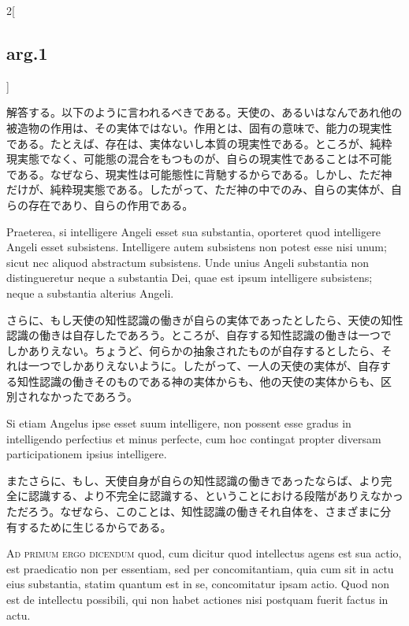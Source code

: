 \documentclass[paper=a4paper,fontsize=10pt,jafontsize=9pt,titlepage]{jlreq}
\begin{document}
\begin{paracol}{2}[\subsection{arg.1}]
\switchcolumn

解答する。以下のように言われるべきである。天使の、あるいはなんであれ他の
 被造物の作用は、その実体ではない。作用とは、固有の意味で、能力の現実性
 である。たとえば、存在は、実体ないし本質の現実性である。ところが、純粋
 現実態でなく、可能態の混合をもつものが、自らの現実性であることは不可能
 である。なぜなら、現実性は可能態性に背馳するからである。しかし、ただ神
 だけが、純粋現実態である。したがって、ただ神の中でのみ、自らの実体が、自
 らの存在であり、自らの作用である。

\switchcolumn*

Praeterea, si intelligere Angeli esset sua substantia, oporteret
 quod intelligere Angeli esset subsistens. Intelligere autem subsistens
 non potest esse nisi unum; sicut nec aliquod abstractum
 subsistens. Unde unius Angeli substantia non distingueretur neque a
 substantia Dei, quae est ipsum intelligere subsistens; neque a
 substantia alterius Angeli.

\switchcolumn

さらに、もし天使の知性認識の働きが自らの実体であったとしたら、天使の知性
 認識の働きは自存したであろう。ところが、自存する知性認識の働きは一つで
 しかありえない。ちょうど、何らかの抽象されたものが自存するとしたら、そ
 れは一つでしかありえないように。したがって、一人の天使の実体が、自存す
 る知性認識の働きそのものである神の実体からも、他の天使の実体からも、区
 別されなかったであろう。

\switchcolumn*

Si etiam Angelus ipse esset suum
 intelligere, non possent esse gradus in intelligendo perfectius et
 minus perfecte, cum hoc contingat propter diversam participationem
 ipsius intelligere.

\switchcolumn

またさらに、もし、天使自身が自らの知性認識の働きであったならば、より完
 全に認識する、より不完全に認識する、ということにおける段階がありえなかっ
 ただろう。なぜなら、このことは、知性認識の働きそれ自体を、さまざまに分
 有するために生じるからである。

\switchcolumn*[\subsection{ad.1}]

{\scshape  Ad primum ergo dicendum} quod, cum dicitur quod intellectus
 agens est sua actio, est praedicatio non per essentiam, sed per
 concomitantiam, quia cum sit in actu eius substantia, statim quantum
 est in se, concomitatur ipsam actio. Quod non est de intellectu
 possibili, qui non habet actiones nisi postquam fuerit factus in actu.


\end{paracol}
\end{document}
